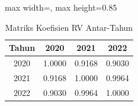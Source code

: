 \begin{table}[H]
\centering
\caption{Matriks Koefisien RV Antar-Tahun} \label{tab:samplerv}
\begin{adjustbox}{max width=\textwidth, max height=0.85\textheight}
\begin{tabular}{|c|c|c|c|}
\hline
\textbf{Tahun} & \textbf{2020} & \textbf{2021} & \textbf{2022} \\
\hline
2020 & 1.0000 & 0.9168 & 0.9030 \\
2021 & 0.9168 & 1.0000 & 0.9964 \\
2022 & 0.9030 & 0.9964 & 1.0000 \\
\hline
\end{tabular}
\end{adjustbox}
\end{table}